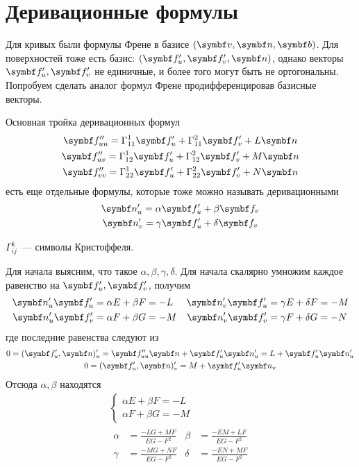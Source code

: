 \documentclass[main]{subfiles}
\begin{document}
\chapter{Деривационные формулы}
Для кривых были формулы Френе в базисе $(\vv, \vn, \vb)$.
Для поверхностей тоже есть базис: $(\vf'_u, \vf'_v, \vn)$, однако векторы $\vf'_u, \vf'_v$ не единичные,
и более того могут быть не ортогональны.
Попробуем сделать аналог формул Френе продифференцировав базисные векторы.
\begin{definition}
    Основная тройка деривационных формул
    \begin{gather*}
        \vf''_{uu} = \Gamma^1_{11} \vf'_u + \Gamma^2_{11} \vf'_v + L \vn \\
        \vf''_{uv} = \Gamma^1_{12} \vf'_u + \Gamma^2_{12} \vf'_v + M \vn \\
        \vf''_{vv} = \Gamma^1_{22} \vf'_u + \Gamma^2_{22} \vf'_v + N \vn
    \end{gather*}
    есть еще отдельные формулы, которые тоже можно называть деривационными
    \begin{gather*}
        \vn'_u = \alpha \vf'_u + \beta \vf_v\\
        \vn'_v = \gamma \vf'_u + \delta \vf_v
    \end{gather*}
\end{definition}
\begin{definition}
    $\Gamma^k_{ij}$~--- символы Кристоффеля.
\end{definition}
Для начала выясним, что такое $\alpha, \beta, \gamma, \delta$.
Для начала скалярно умножим каждое равенство на $\vf'_u, \vf'_v$, получим
\begin{align*}
    \vn'_u \vf'_u & = \alpha E + \beta F = -L & \vn'_v \vf'_u & = \gamma E + \delta F = -M \\
    \vn'_u \vf'_v & = \alpha F + \beta G = -M & \vn'_v \vf'_v & = \gamma F + \delta G = -N
\end{align*}
где последние равенства следуют из
\begin{gather*}
    0 = (\vf'_u, \vn)'_u = \vf''_{uu} \vn + \vf'_u \vn'_u = L + \vf'_u \vn'_u\\
    0 = (\vf'_u, \vn)'_v = M + \vf'_u \vn_v
\end{gather*}
Отсюда $\alpha, \beta$ находятся
\begin{gather*}
    \begin{cases}
        \alpha E + \beta F = -L \\
        \alpha F + \beta G = -M
    \end{cases}\\
    \begin{aligned}
        \alpha & = \frac{-LG + MF}{EG - F^2} & \beta  & = \frac{-EM + LF}{EG - F^2} \\
        \gamma & = \frac{-MG + NF}{EG - F^2} & \delta & = \frac{-EN + MF}{EG - F^2}
    \end{aligned}
\end{gather*}
\end{document}

